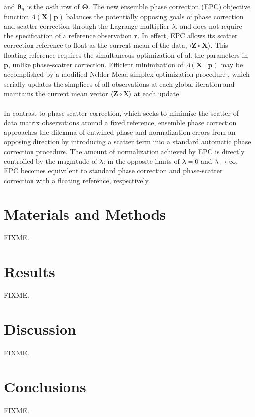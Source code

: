 \begin{doublespace}
and $\boldsymbol{\theta}_n$ is the $n$-th row of $\mathbf{\Theta}$. The new
ensemble phase correction (EPC) objective function
$\Lambda(\mathbf{X} \mid \mathbf{p})$ balances the potentially opposing goals
of phase correction and scatter correction through the Lagrange multiplier
$\lambda$, and does not require the specification of a reference observation
$\mathbf{r}$. In effect, EPC allows its scatter correction reference to float
as the current mean of the data, $\langle \mathbf{Z} \circ \mathbf{X} \rangle$.
This floating reference requires the simultaneous optimization of all the
parameters in $\mathbf{p}$, unlike phase-scatter correction. Efficient
minimization of $\Lambda(\mathbf{X} \mid \mathbf{p})$ may be accomplished by
a modified Nelder-Mead simplex optimization procedure \cite{nelder:compj1964},
which serially updates the simplices of all observations at each global
iteration and maintains the current mean vector
$\langle \mathbf{Z} \circ \mathbf{X} \rangle$ at each update.
\\\\
In contrast to phase-scatter correction, which seeks to minimize the scatter
of data matrix observations around a fixed reference, ensemble phase correction
approaches the dilemma of entwined phase and normalization errors from an
opposing direction by introducing a scatter term into a standard automatic
phase correction procedure. The amount of normalization achieved by EPC is
directly controlled by the magnitude of $\lambda$: in the opposite limits of
$\lambda = 0$ and $\lambda \to \infty$, EPC becomes equivalent to standard
phase correction and phase-scatter correction with a floating reference,
respectively.
\end{doublespace}

\section{Materials and Methods}

\begin{doublespace}
FIXME.
\end{doublespace}

\section{Results}

\begin{doublespace}
FIXME.
\end{doublespace}

\section{Discussion}

\begin{doublespace}
FIXME.
\end{doublespace}

\section{Conclusions}

\begin{doublespace}
FIXME.
\end{doublespace}




